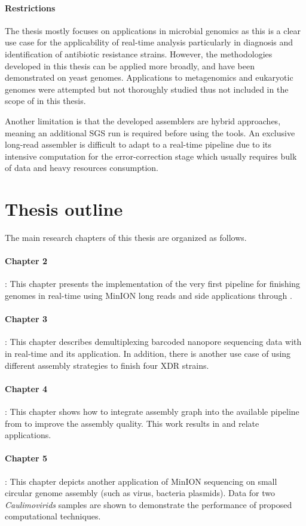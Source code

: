 \paragraph{Restrictions}
The thesis mostly focuses on applications in microbial genomics as this is a clear use case for the applicability of real-time analysis particularly in diagnosis and identification of antibiotic resistance strains.  However, the methodologies developed in this thesis can be applied more broadly, and have been demonstrated on yeast genomes. Applications to metagenomics and eukaryotic genomes were attempted but not thoroughly studied thus not included in the scope of in this thesis.

Another limitation is that the developed assemblers are hybrid approaches, meaning an additional SGS run is required before using the tools. An exclusive long-read assembler is difficult to adapt to a real-time pipeline due to its intensive computation for the error-correction stage which usually requires bulk of data and heavy resources consumption.
\section{Thesis outline}
The main research chapters of this thesis are organized as follows.
\paragraph{Chapter 2}: 
This chapter presents the implementation of the very first pipeline for finishing genomes in real-time using MinION long reads and side applications through \npscarf{}.
\paragraph{Chapter 3}:
This chapter describes demultiplexing barcoded nanopore sequencing data with \npbarcode{} in real-time and its application. In addition, there is another use case of using different assembly strategies to finish four XDR \kp{} strains.
\paragraph{Chapter 4}: 
This chapter shows how to integrate assembly graph into the available pipeline from \npscarf{} to improve the assembly quality. This work results in \npgraph{} and relate applications.
\paragraph{Chapter 5}: 
This chapter depicts another application of MinION sequencing on small circular genome assembly (such as virus, bacteria plasmids). Data for two \emph{Caulimovirids} samples are shown to demonstrate the performance of proposed computational techniques.